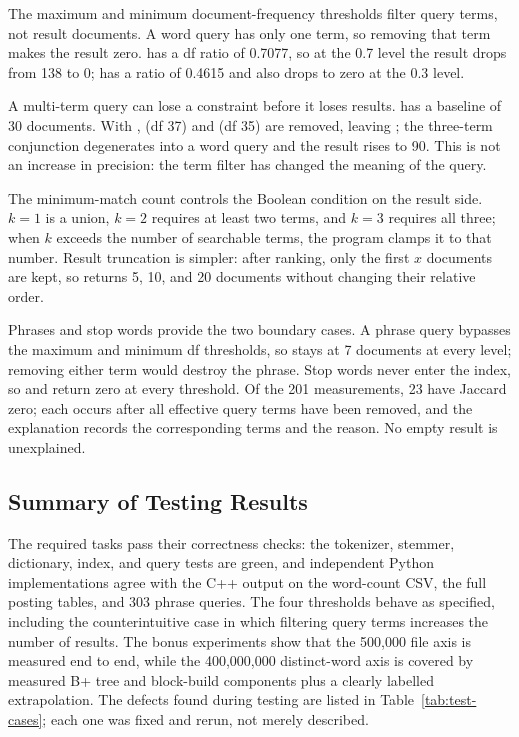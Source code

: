 The maximum and minimum document-frequency thresholds filter query terms, not
result documents. A word query has only one term, so removing that term makes
the result zero.  has a df ratio of 0.7077, so at the 0.7 level the
result drops from 138 to 0;  has a ratio of 0.4615 and also drops to
zero at the 0.3 level.

A multi-term query can lose a constraint before it loses results.
 has a baseline of 30 documents. With ,
 (df 37) and  (df 35) are removed, leaving ;
the three-term conjunction degenerates into a word query and the result rises
to 90. This is not an increase in precision: the term filter has changed the
meaning of the query.

The minimum-match count controls the Boolean condition on the result side.
$k=1$ is a union, $k=2$ requires at least two terms, and $k=3$ requires all
three; when $k$ exceeds the number of searchable terms, the program clamps it to
that number. Result truncation is simpler: after ranking, only the first $x$
documents are kept, so  returns 5, 10, and 20 documents without
changing their relative order.

Phrases and stop words provide the two boundary cases. A phrase query bypasses
the maximum and minimum df thresholds, so  stays at 7
documents at every level; removing either term would destroy the phrase. Stop
words never enter the index, so  and  return zero at every
threshold. Of the 201 measurements, 23 have Jaccard zero; each occurs after all
effective query terms have been removed, and the explanation records the
corresponding terms and the reason. No empty result is unexplained.




\subsection{Summary of Testing Results}
\label{sec:results-summary}

The required tasks pass their correctness checks: the tokenizer, stemmer,
dictionary, index, and query tests are green, and independent Python
implementations agree with the C++ output on the word-count CSV, the full
posting tables, and 303 phrase queries. The four thresholds behave as
specified, including the counterintuitive case in which filtering query terms
increases the number of results. The bonus experiments show that the 500,000
file axis is measured end to end, while the 400,000,000 distinct-word axis is
covered by measured B+ tree and block-build components plus a clearly labelled
extrapolation. The defects found during testing are listed in
Table~\ref{tab:test-cases}; each one was fixed and rerun, not merely described.
